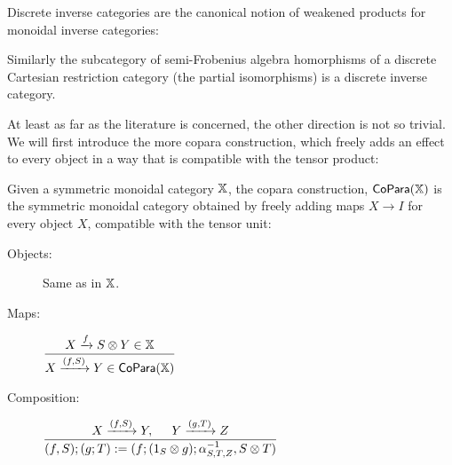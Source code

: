 Discrete inverse categories are the canonical notion of weakened products for monoidal inverse categories:

\begin{lemma}
Similarly the subcategory of  semi-Frobenius algebra homorphisms of a discrete Cartesian restriction category (the partial isomorphisms) is a discrete inverse category.
\end{lemma}



At least as far as the literature is concerned, the other direction is not so trivial.  We will first introduce the more copara construction, which freely adds an effect to every object in a way that is compatible with the tensor product:


\begin{definition}
Given a symmetric monoidal category $\mathbb{X}$, the copara construction, ${\sf CoPara}(\mathbb{X})$ is the symmetric monoidal category obtained by freely adding maps $X\to I$ for every object $X$, compatible with the tensor unit:

\begin{description}
\item[Objects:] Same as in $\mathbb{X}$.

\item[Maps:]  
\hfil $
\dfrac{ X\xrightarrow{f}  S\otimes Y \in \mathbb{X}           }
         { X\xrightarrow{(f,S)} Y \in  {\sf CoPara}(\mathbb{X}) }
$

\item[Composition:]
\hfil $
\dfrac{X\xrightarrow{(f,S)} Y , \hspace*{.5cm} Y\xrightarrow{(g,T)} Z }
         {(f,S);(g;T) := (f;(1_S \otimes g);\alpha^{-1}_{S,T,Z} ,S\otimes T) } 
$




\end{description}
\end{definition}
